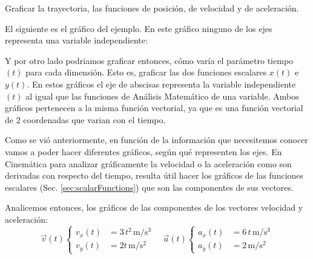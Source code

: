 \begin{mdframed}[style=ExampleFrame]
    \begin{example}
    \end{example}
    \begin{formatI}
        Graficar la trayectoria, las funciones de posición, de velocidad y de aceleración.
    \end{formatI}
    El siguiente es el gráfico del ejemplo.
    En este gráfico ninguno de los ejes representa una variable independiente:
    
    \begin{center}
        \def\svgwidth{\linewidth}
        
    \end{center}
    
    Y por otro lado podriamos graficar entonces, cómo varía el parámetro tiempo $(t)$ para cada dimensión.
    Esto es, graficar las dos funciones escalares $x(t)$ e $y(t)$.
    En estos gráficos el eje de abscisas representa la variable independiente $(t)$ al igual que las funciones de Análisis Matemático de una variable.
    Ambos gráficos pertenecen a la misma función vectorial, ya que es una función vectorial de 2 coordenadas que varian con el tiempo.
    
    \begin{center}
        \def\svgwidth{\linewidth}
        
    \end{center}
    
    Como se vió anteriormente, en función de la información que necesitemos conocer vamos a poder hacer diferentes gráficos, según qué representen los ejes.
    En Cinemática para analizar gráficamente la velocidad o la aceleración como son derivadas con respecto del tiempo, resulta útil hacer los gráficos de las funciones escalares (Sec. \ref{sec:scalarFunctions}) que son las componentes de sus vectores.
    
    Analicemos entonces, los gráficos de las componentes de los vectores velocidad y aceleración:
    \[
      \Vec{v}(t)
      \left\{
      \begin{aligned}
        v_x(t) &= 3 \, t^2 \, \si{\metre\per\second^3}
        \\
        v_y(t) &= 2t \, \si{\metre\per\second^2}
      \end{aligned}
      \right.
      \quad
      \Vec{a}(t)
      \left\{
      \begin{aligned}
        a_x(t) &= 6 \, t \, \si{\metre\per\second^3}
        \\
        a_y(t) &= 2 \, \si{\metre\per\second^2}
      \end{aligned}
      \right.
    \]
    

\end{mdframed}
